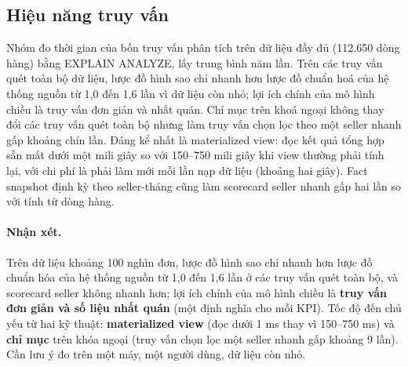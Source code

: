 \subsection{Hiệu năng truy vấn}
Nhóm đo thời gian của bốn truy vấn phân tích trên dữ liệu đầy đủ (112.650 dòng hàng) bằng EXPLAIN ANALYZE, lấy trung bình năm lần. Trên các truy vấn quét toàn bộ dữ liệu, lược đồ hình sao chỉ nhanh hơn lược đồ chuẩn hoá của hệ thống nguồn từ 1,0 đến 1,6 lần vì dữ liệu còn nhỏ; lợi ích chính của mô hình chiều là truy vấn đơn giản và nhất quán. Chỉ mục trên khoá ngoại không thay đổi các truy vấn quét toàn bộ nhưng làm truy vấn chọn lọc theo một seller nhanh gấp khoảng chín lần. Đáng kể nhất là materialized view: đọc kết quả tổng hợp sẵn mất dưới một mili giây so với 150–750 mili giây khi view thường phải tính lại, với chi phí là phải làm mới mỗi lần nạp dữ liệu (khoảng hai giây). Fact snapshot định kỳ theo seller-tháng cũng làm scorecard seller nhanh gấp hai lần so với tính từ dòng hàng.


\paragraph{Nhận xét.} Trên dữ liệu khoảng 100 nghìn đơn, lược đồ hình sao chỉ nhanh hơn lược đồ chuẩn hóa của hệ thống nguồn từ 1,0 đến 1,6 lần ở các truy vấn quét toàn bộ, và scorecard seller không nhanh hơn; lợi ích chính của mô hình chiều là \textbf{truy vấn đơn giản và số liệu nhất quán} (một định nghĩa cho mỗi KPI). Tốc độ đến chủ yếu từ hai kỹ thuật: \textbf{materialized view} (đọc dưới 1 ms thay vì 150--750 ms) và \textbf{chỉ mục} trên khóa ngoại (truy vấn chọn lọc một seller nhanh gấp khoảng 9 lần). Cần lưu ý đo trên một máy, một người dùng, dữ liệu còn nhỏ.
